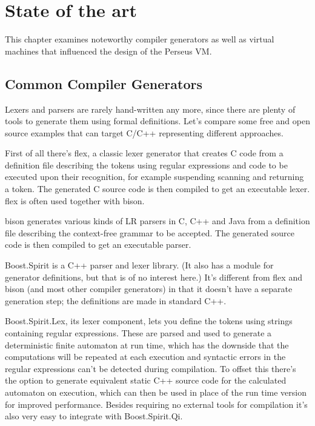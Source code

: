 
\chapter{State of the art}
	
	
	This chapter examines noteworthy compiler generators as well as virtual machines
	that influenced the design of the Perseus
	VM.
	
	\section{Common Compiler Generators}
    	
		Lexers and parsers are rarely hand-written any more, since there are plenty of tools to generate them using formal definitions. Let's compare some free and open source examples that can target C/C++ representing different approaches.
		
		First of all there's flex\cite{flex}, a classic lexer generator that creates C code from a definition file describing the tokens using regular expressions and code to be executed upon their recognition, for example suspending scanning and returning a token. The generated C source code is then compiled to get an executable lexer. flex is often used together with bison.
		
		bison\cite{bison} generates various kinds of LR parsers in C, C++ and Java from a definition file describing the context-free grammar to be accepted. The generated source code is then compiled to get an executable parser.
		
		Boost.Spirit\cite{spirit} is a C++ parser and lexer library. (It also has a module for generator definitions, but that is of no interest here.) It's different from flex and bison (and most other compiler generators) in that it doesn't have a separate generation step; the definitions are made in standard C++.
		
		Boost.Spirit.Lex, its lexer component, lets you define the tokens using strings containing regular expressions. These are parsed and used to generate a deterministic finite automaton at run time, which has the downside that the computations will be repeated at each execution and syntactic errors in the regular expressions can't be detected during compilation. To offset this there's the option to generate equivalent static C++ source code for the calculated automaton on execution, which can then be used in place of the run time version for improved performance. Besides requiring no external tools for compilation it's also very easy to integrate with Boost.Spirit.Qi.
		
